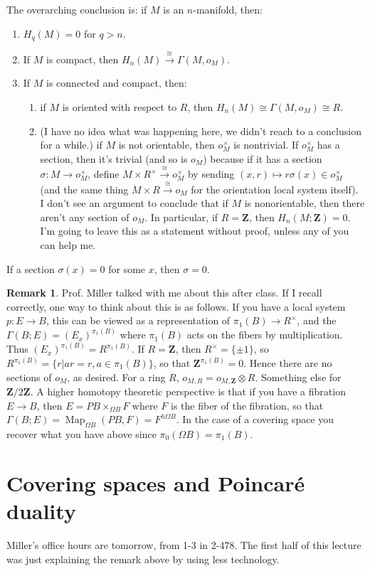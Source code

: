 \documentclass{amsart}
\theoremstyle{theorem}
\theoremstyle{definition}
\newtheorem{remark}[theorem]{Remark}
\DeclareMathOperator{\Map}{Map}
\newcommand{\Z}{\mathbf Z}
\begin{document}
The overarching conclusion is: if $M$ is an $n$-manifold, then:
\begin{enumerate}
\item $H_q(M)=0$ for $q>n$.
\item If $M$ is compact, then $H_n(M)\xrightarrow{\cong}\Gamma(M,o_M)$.
\item If $M$ is connected and compact, then:
	\begin{enumerate}
	\item if $M$ is oriented with respect to $R$, then $H_n(M)\cong \Gamma(M,o_M)\cong R$.
	\item (I have no idea what was happening here, we didn't reach to a conclusion for a while.) if $M$ is not orientable, then $o_M^\times$ is nontrivial. If $o_M^\times$ has a section, then it's trivial (and so is $o_M$) because if it has a section $\sigma:M\to o^\times_M$, define $M\times R^\times\xrightarrow{\cong} o_M^\times$ by sending $(x,r)\mapsto r\sigma(x)\in o_M^\times$ (and the same thing $M\times R\xrightarrow{\cong} o_M$ for the orientation local system itself). I don't see an argument to conclude that if $M$ is nonorientable, then there aren't any section of $o_M$. In particular, if $R=\Z$, then $H_n(M;\Z)=0$. I'm going to leave this as a statement without proof, unless any of you can help me.
	\end{enumerate}
\end{enumerate}
If a section $\sigma(x)=0$ for some $x$, then $\sigma=0$.
\begin{remark}
Prof. Miller talked with me about this after class. If I recall correctly, one way to think about this is as follows. If you have a local system $p:E\to B$, this can be viewed as a representation of $\pi_1(B)\to R^\times$, and the $\Gamma(B;E)=(E_x)^{\pi_1(B)}$ where $\pi_1(B)$ acts on the fibers by multiplication. Thus $(E_x)^{\pi_1(B)}=R^{\pi_1(B)}$. If $R=\Z$, then $R^\times=\{\pm 1\}$, so $R^{\pi_1(B)}=\{r|ar=r,a\in\pi_1(B)\}$, so that $\Z^{\pi_1(B)}=0$. Hence there are no sections of $o_M$, as desired. For a ring $R$, $o_{M,R}=o_{M,\Z}\otimes R$. Something else for $\Z/2\Z$. A higher homotopy theoretic perspective is that if you have a fibration $E\to B$, then $E=PB\times_{\Omega B}F$ where $F$ is the fiber of the fibration, so that $\Gamma(B;E)=\Map_{\Omega B}(PB,F)=F^{h\Omega B}$. In the case of a covering space you recover what you have above since $\pi_0(\Omega B)=\pi_1(B)$.
\end{remark}
\section{Covering spaces and Poincar\'{e} duality}
Miller's office hours are tomorrow, from 1-3 in 2-478. The first half of this lecture was just explaining the remark above by using less technology.
\end{document}
